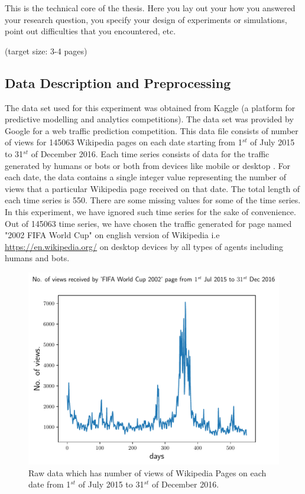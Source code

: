   This is the technical core of the thesis. Here you lay out your how
  you answered your research question, you specify your design of
  experiments or simulations, point out difficulties that you
  encountered, etc.

  (target size: 3-4 pages)
  
  \subsection{Data Description and Preprocessing}
  
  \indent \indent
  		The data set used for this experiment was obtained from Kaggle (a platform for predictive modelling and analytics competitions). The data set was provided by Google for a web traffic prediction competition.
		 This data file consists of  number of views for 145063 Wikipedia pages on each date starting from 1$^{st}$ of July 2015 to 31$^{st}$ of December 2016. Each time series consists of data for the traffic generated by humans or bots or both from devices like mobile or desktop .
		 For each date, the data contains a single integer value representing the number of views that a particular Wikipedia page received on that date.  The total length of each time series is 550. There are some missing values for some of the time series. In this experiment, we have ignored such time series for the sake of convenience. Out of 145063 time series, we have chosen the traffic generated for page named "2002 FIFA World Cup" on english version of Wikipedia i.e \url{https://en.wikipedia.org/} on desktop devices by all types of agents including humans and bots. \\
		 
		\begin{figure}
		     \centering
		     \includegraphics[width = 15cm]{./description/images/rawSignal}
			   
			   \caption{Raw data which has number of views of Wikipedia Pages on each date from 1$^{st}$ of July  2015 to 31$^{st}$ of December 2016. }
			\label{fig:raw}
			\end{figure}
			
